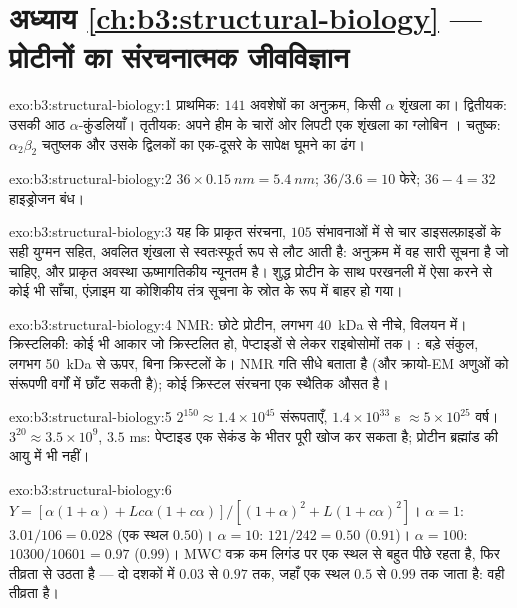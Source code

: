 \section*{अध्याय \ref{ch:b3:structural-biology} --- प्रोटीनों का संरचनात्मक जीवविज्ञान}

\begin{solution}{exo:b3:structural-biology:1}
प्राथमिक: $141$ अवशेषों का अनुक्रम, किसी $\alpha$ शृंखला का।
द्वितीयक: उसकी आठ $\alpha$-कुंडलियाँ। तृतीयक: अपने हीम के चारों ओर
लिपटी एक शृंखला का ग्लोबिन । चतुष्क: $\alpha_{2}\beta_{2}$
चतुष्लक और उसके द्विलकों का एक-दूसरे के सापेक्ष घूमने का ढंग।
\end{solution}

\begin{solution}{exo:b3:structural-biology:2}
$36\times \qty{0.15}{nm} = \qty{5.4}{nm}$; $36/3.6 = 10$ फेरे;
$36 - 4 = 32$ हाइड्रोजन बंध।
\end{solution}

\begin{solution}{exo:b3:structural-biology:3}
यह कि प्राकृत संरचना, $105$ संभावनाओं में से चार डाइसल्फ़ाइडों के सही
युग्मन सहित, अवलित शृंखला से स्वतःस्फूर्त रूप से लौट आती है: अनुक्रम
में वह सारी सूचना है जो चाहिए, और प्राकृत अवस्था ऊष्मागतिकीय न्यूनतम
है। शुद्ध प्रोटीन के साथ परखनली में ऐसा करने से कोई भी साँचा, एंज़ाइम
या कोशिकीय तंत्र सूचना के स्रोत के रूप में बाहर हो गया।
\end{solution}

\begin{solution}{exo:b3:structural-biology:4}
NMR: छोटे प्रोटीन, लगभग \qty{40}{kDa} से नीचे, विलयन में।
क्रिस्टलिकी: कोई भी आकार जो क्रिस्टलित हो, पेप्टाइडों से लेकर
राइबोसोमों तक। : बड़े संकुल, लगभग
\qty{50}{kDa} से ऊपर, बिना क्रिस्टलों के। NMR गति सीधे बताता है (और
क्रायो-EM अणुओं को संरूपणी वर्गों में छाँट सकती है); कोई क्रिस्टल
संरचना एक स्थैतिक औसत है।
\end{solution}

\begin{solution}{exo:b3:structural-biology:5}
$2^{150} \approx 1.4\times 10^{45}$ संरूपताएँ, $1.4\times 10^{33}$
s $\approx 5\times 10^{25}$ वर्ष। $3^{20} \approx 3.5\times 10^{9}$,
$3.5$ ms: पेप्टाइड एक सेकंड के भीतर पूरी खोज कर सकता है; प्रोटीन
ब्रह्मांड की आयु में भी नहीं।
\end{solution}

\begin{solution}{exo:b3:structural-biology:6}
$Y = [\alpha(1+\alpha) + Lc\alpha(1+c\alpha)]/[(1+\alpha)^{2} +
L(1+c\alpha)^{2}]$। $\alpha = 1$: $3.01/106 = 0.028$ (एक स्थल
$0.50$)। $\alpha = 10$: $121/242 = 0.50$ ($0.91$)। $\alpha = 100$:
$\num{10300}/\num{10601} = 0.97$ ($0.99$)। MWC वक्र कम लिगंड पर एक
स्थल से बहुत पीछे रहता है, फिर तीव्रता से उठता है --- दो दशकों में
$0.03$ से $0.97$ तक, जहाँ एक स्थल $0.5$ से $0.99$ तक जाता है: वही
तीव्रता  है।
\end{solution}

